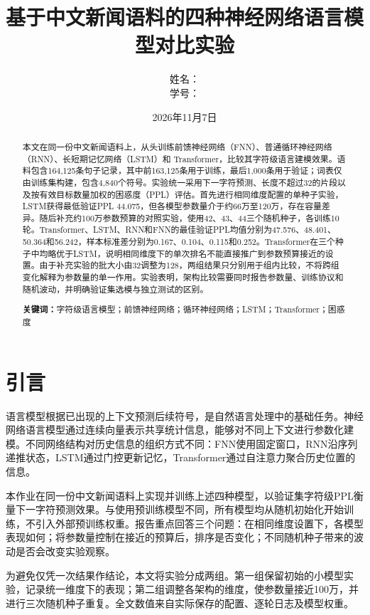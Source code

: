 ﻿\documentclass[UTF8,a4paper,12pt]{ctexart}
\title{\textbf{基于中文新闻语料的四种神经网络语言模型对比实验}}
\author{
  姓名：\underline{\makebox[5cm][c]{苏婕}}\\[0.6em]
  学号：\underline{\makebox[5cm][c]{2026E8000267004}}
}
\date{2026年11月7日}
\begin{document}
\maketitle
\thispagestyle{empty}
\vfill
\begin{abstract}
本文在同一份中文新闻语料上，从头训练前馈神经网络（FNN）、普通循环神经网络（RNN）、长短期记忆网络（LSTM）和 Transformer，比较其字符级语言建模效果。语料包含164,125条句子记录，其中前163,125条用于训练，最后1,000条用于验证；词表仅由训练集构建，包含4,840个符号。实验统一采用下一字符预测、长度不超过32的片段以及按有效目标数量加权的困惑度（PPL）评估。首先进行相同维度配置的单种子实验，LSTM获得最低验证PPL 44.075，但各模型参数量介于约66万至120万，存在容量差异。随后补充约100万参数预算的对照实验，使用42、43、44三个随机种子，各训练10轮。Transformer、LSTM、RNN和FNN的最佳验证PPL均值分别为47.576、48.401、50.364和56.242，样本标准差分别为0.167、0.104、0.115和0.252。Transformer在三个种子中均略优于LSTM，说明相同维度下的单次排名不能直接推广到参数预算接近的设置。由于补充实验的批大小由32调整为128，两组结果只分别用于组内比较，不将跨组变化解释为参数量的单一作用。实验表明，架构比较需要同时报告参数量、训练协议和随机波动，并明确验证集选模与独立测试的区别。

\noindent\textbf{关键词：}字符级语言模型；前馈神经网络；循环神经网络；LSTM；Transformer；困惑度
\end{abstract}

\newpage
\tableofcontents
\newpage

\section{引言}
语言模型根据已出现的上下文预测后续符号，是自然语言处理中的基础任务。神经网络语言模型通过连续向量表示共享统计信息，能够对不同上下文进行参数化建模\cite{bengio2003}。不同网络结构对历史信息的组织方式不同：FNN使用固定窗口，RNN沿序列递推状态，LSTM通过门控更新记忆，Transformer通过自注意力聚合历史位置的信息。

本作业在同一份中文新闻语料上实现并训练上述四种模型，以验证集字符级PPL衡量下一字符预测效果。与使用预训练模型不同，所有模型均从随机初始化开始训练，不引入外部预训练权重。报告重点回答三个问题：在相同维度设置下，各模型表现如何；将参数量控制在接近的预算后，排序是否变化；不同随机种子带来的波动是否会改变实验观察。

为避免仅凭一次结果作结论，本文将实验分成两组。第一组保留初始的小模型实验，记录统一维度下的表现；第二组调整各架构的维度，使参数量接近100万，并进行三次随机种子重复。全文数值来自实际保存的配置、逐轮日志及模型权重。
\end{document}
